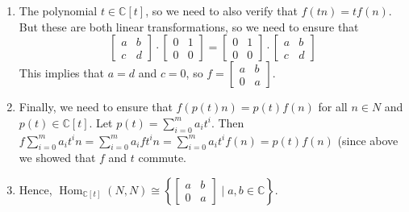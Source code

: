 \documentclass[12pt]{article}
\newcommand{\bbC}{\mathbb{C}}
\newcommand{\Hom}{\operatorname{Hom}}
\begin{document}
\begin{enumerate}
\begin{enumerate}
{\begin{enumerate}
\item The polynomial $t\in \bbC[t]$, so we need to also verify that
  $f(t n) = tf(n).$ But these are both linear transformations, so we
  need to ensure that 
  \[\begin{bmatrix} a & b \\ c & d \end{bmatrix}
    \cdot \begin{bmatrix} 0 & 1 \\ 0 & 0 \end{bmatrix}
    =\begin{bmatrix} 0 & 1 \\ 0 & 0 \end{bmatrix} \cdot \begin{bmatrix} a & b \\ c & d \end{bmatrix}\]
This implies that $a=d$ and $c=0$, so $f=\begin{bmatrix} a & b \\ 0 &
  a\end{bmatrix}$. 
\item Finally, we need to ensure that $f( p(t) n) = p(t) f(n)$ for all
  $n\in N$ and $p(t) \in \bbC[t]$. Let $p(t) = \sum\limits_{i=0}^m a_i
  t^i$. Then $f\sum\limits_{i=0}^m a_i t^i n = \sum\limits_{i=0}^m a_i
  ft^i n = \sum\limits_{i=0}^m a_i t^i f(n) = p(t) f(n)$ (since above
  we showed that $f$ and $t$ commute.
\item Hence, $\Hom_{\bbC[t]}(N, N) \cong \left\{ \begin{bmatrix} a & b
      \\ 0 & a \end{bmatrix} \mid a,b\in \bbC\right\}$. 
\end{enumerate}
}

  \end{enumerate}


\end{enumerate}
\end{document}

